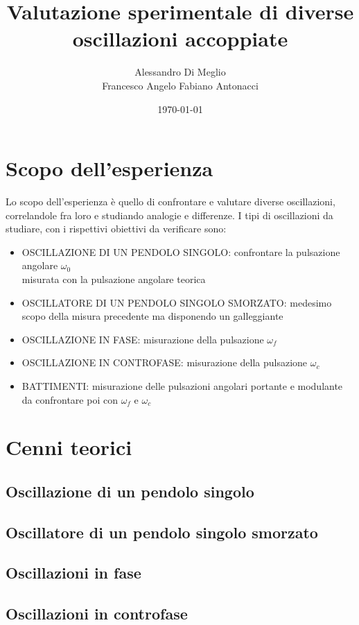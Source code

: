 \documentclass{article}
\title{Valutazione sperimentale di diverse oscillazioni accoppiate}
\author{Alessandro Di Meglio \\ Francesco Angelo Fabiano Antonacci}
\date{\today}
\begin{document}
\maketitle

\section{Scopo dell'esperienza} 

Lo scopo dell'esperienza è quello di confrontare e valutare diverse oscillazioni, correlandole fra loro e studiando analogie e differenze.
I tipi di oscillazioni da studiare, con i rispettivi obiettivi da verificare sono:

\begin{itemize}

	    \item OSCILLAZIONE DI UN PENDOLO SINGOLO: confrontare la pulsazione angolare $\omega_{0}$ \\ misurata con la pulsazione angolare teorica
	    \item OSCILLATORE DI UN PENDOLO SINGOLO SMORZATO: medesimo scopo della misura precedente ma disponendo un galleggiante
	    \item OSCILLAZIONE IN FASE: misurazione della pulsazione $\omega_{f}$
	    \item OSCILLAZIONE IN CONTROFASE: misurazione della pulsazione $\omega_{c}$
	    \item BATTIMENTI: misurazione delle pulsazioni angolari portante e modulante da confrontare poi con $\omega_{f}$ e $\omega_{c}$
    
\end{itemize}

\section{Cenni teorici}
 
			\subsection{ Oscillazione di un pendolo singolo}
		\subsection{  Oscillatore di un pendolo singolo smorzato }
		\subsection{  Oscillazioni in fase}
		\subsection{  Oscillazioni in controfase}
\end{document}
